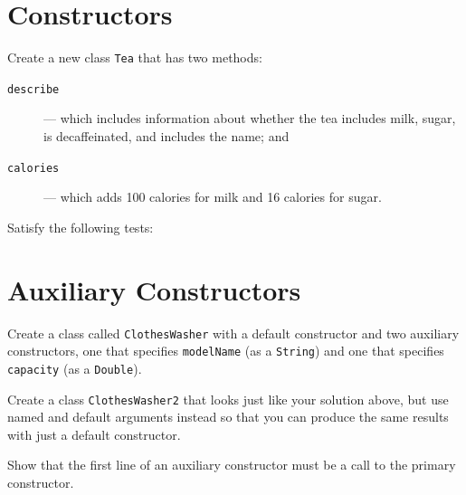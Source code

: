 \documentclass[a4paper,12pt]{exam}
\begin{document}
\begin{questions}
\section*{Constructors}

\question
Create a new class \texttt{Tea} that has two methods: 
\begin{description}
\item[\texttt{describe}] --- which includes information about whether the tea 
includes milk, sugar, is decaffeinated, and includes the name; and 
\item[\texttt{calories}] --- which adds 100 calories for milk and 16 calories for sugar. 
\end{description}
Satisfy the following tests:

\begin{solution}
\end{solution}

\section*{Auxiliary Constructors}

\question
Create a class called \texttt{ClothesWasher} with a default constructor 
and two auxiliary constructors, one that specifies \texttt{modelName} 
(as a \texttt{String}) and one that specifies \texttt{capacity} (as a \texttt{Double}).

\begin{solution}
\end{solution}

\question
Create a class \texttt{ClothesWasher2} that looks just like your solution above, 
but use named and default arguments instead so that you can produce the same results with 
just a default constructor.

\begin{solution}
\end{solution}

\question
Show that the first line of an auxiliary constructor must be a call to the primary constructor.

\begin{solution}
\end{solution}


\end{questions}
\end{document}
